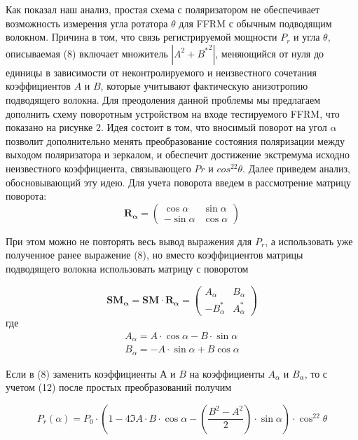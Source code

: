 \documentclass{article}
\begin{document}
Как показал наш анализ, простая схема с поляризатором не обеспечивает возможность измерения угла ротатора $\theta$ для FFRM с обычным подводящим волокном.  Причина в том, что связь регистрируемой мощности $P_r$ и угла $\theta$, описываемая (8) включает множитель $|A^2+{B^*}^2|$, меняющийся от нуля до единицы в зависимости от неконтролируемого и неизвестного сочетания коэффициентов $A$ и $B$, которые учитывают фактическую анизотропию подводящего волокна. Для преодоления данной проблемы мы предлагаем дополнить схему поворотным устройством на входе тестируемого FFRM, что показано на рисунке 2. Идея состоит в том, что вносимый поворот на угол $\alpha$ позволит дополнительно менять преобразование состояния поляризации между выходом поляризатора и зеркалом, и обеспечит достижение экстремума исходно неизвестного коэффициента, связывающего $Pr$ и $cos^22\theta$. Далее приведем анализ, обосновывающий эту идею.     
Для учета поворота введем в рассмотрение матрицу поворота:
\begin{equation}
	\label{eq:rotMatrix}
	\bm{R_\alpha} = 
	\begin{pmatrix}
		\cos\alpha & \sin\alpha \\
		-\sin\alpha & \cos\alpha
	\end{pmatrix}	
\end{equation}

При этом можно не повторять весь вывод выражения для $P_r$, а использовать уже полученное ранее выражение (8), но вместо коэффициентов матрицы подводящего волокна использовать матрицу с поворотом

\begin{equation}
	\bm{SM_\alpha} = \bm{SM}\cdot\bm{R_\alpha}= 
	\begin{pmatrix}
		A_\alpha & B_\alpha \\
		-B^*_\alpha & A^*_\alpha
	\end{pmatrix}	
\end{equation}
где
\begin{equation}
    \begin{aligned}
        A_\alpha = A\cdot\cos\alpha-B\cdot\sin\alpha \\
        B_\alpha = -A\cdot\sin\alpha+B\cos\alpha
    \end{aligned}
\end{equation}

Если в (8) заменить коэффициенты $А$ и $B$ на коэффициенты $A_\alpha$ и $B_\alpha$, то с учетом (12) после простых преобразований получим

\begin{equation}
    P_r(\alpha)=P_0\cdot\left( 1-4\Im{A\cdot B\cdot \cos\alpha-\left( \frac{B^2-A^2}{2} \right)\cdot\sin\alpha} \right)\cdot\cos^22\theta
\end{equation}
\end{document}
